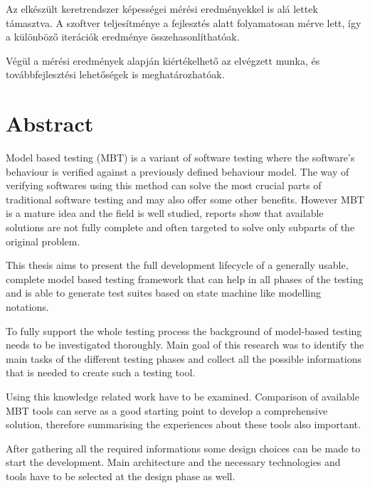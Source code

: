 Az elkészült keretrendszer képességei mérési eredményekkel is alá lettek támasztva. A szoftver teljesítménye a fejlesztés alatt folyamatosan mérve lett, így a különböző iterációk eredménye összehasonlíthatóak.

Végül a mérési eredmények alapján kiértékelhető az elvégzett munka, és továbbfejlesztési lehetőségek is meghatározhatóak.

\vfill
{}
\englishParagraph


\chapter*{Abstract}
\label{cha:abstract}

Model based testing (MBT) is a variant of software testing where the software's behaviour is verified against a previously defined behaviour model. The way of verifying softwares using this method can solve the most crucial parts of traditional software testing and may also offer some other benefits. However MBT is a mature idea and the field is well studied, reports show that available solutions are not fully complete and often targeted to solve only subparts of the original problem.

This thesis aims to present the full development lifecycle of a generally usable, complete model based testing framework that can help in all phases of the testing and is able to generate test suites based on state machine like modelling notations.

To fully support the whole testing process the background of model-based testing needs to be investigated thoroughly. Main goal of this research was to identify the main tasks of the different testing phases and collect all the possible informations that is needed to create such a testing tool.

Using this knowledge related work have to be examined. Comparison of available MBT tools can serve as a good starting point to develop a comprehensive solution, therefore summarising the experiences about these tools also important.

After gathering all the required informations some design choices can be made to start the development. Main architecture and the necessary technologies and tools have to be selected at the design phase as well.

